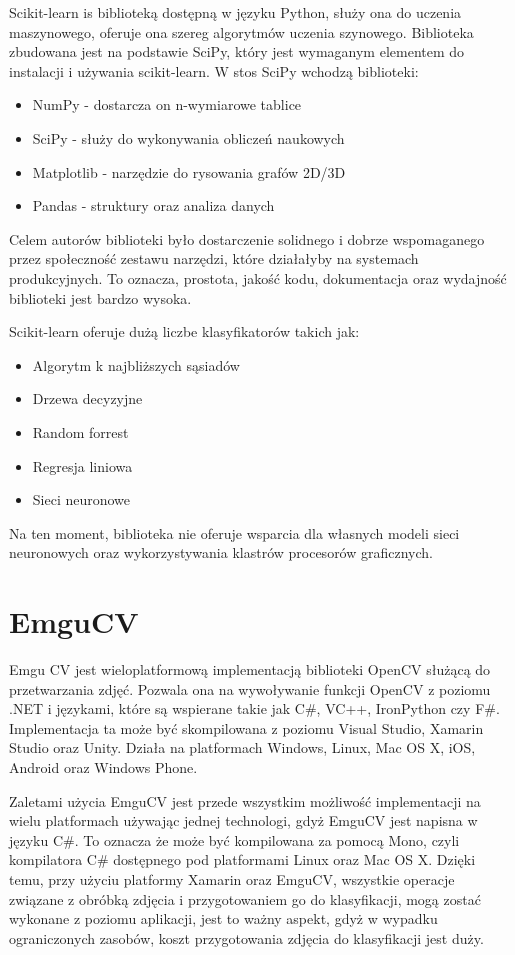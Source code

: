 \documentclass[brudnopis]{xmgr}
\begin{document}
Scikit-learn is biblioteką dostępną w języku Python, służy ona do uczenia maszynowego, oferuje ona szereg algorytmów uczenia szynowego. Biblioteka zbudowana jest na podstawie SciPy, który jest wymaganym elementem do instalacji i używania scikit-learn. W stos SciPy wchodzą biblioteki:

\begin{itemize}
\item
NumPy - dostarcza on n-wymiarowe tablice
\item
SciPy - służy do wykonywania obliczeń naukowych
\item
Matplotlib - narzędzie do rysowania grafów 2D/3D
\item
Pandas - struktury oraz analiza danych
\end{itemize}

Celem autorów biblioteki było dostarczenie solidnego i dobrze wspomaganego przez społeczność zestawu narzędzi, które działałyby na systemach produkcyjnych. To oznacza,  prostota, jakość kodu, dokumentacja oraz wydajność biblioteki jest bardzo wysoka.

Scikit-learn oferuje dużą liczbe klasyfikatorów takich jak:
\begin{itemize}
\item
Algorytm k najbliższych sąsiadów
\item
Drzewa decyzyjne
\item
Random forrest
\item
Regresja liniowa
\item
Sieci neuronowe
\end{itemize}

Na ten moment, biblioteka nie oferuje wsparcia dla własnych modeli sieci neuronowych oraz wykorzystywania klastrów procesorów graficznych.

\section{EmguCV}

Emgu CV jest wieloplatformową implementacją biblioteki OpenCV służącą do przetwarzania zdjęć. Pozwala ona na wywoływanie funkcji OpenCV z poziomu .NET i językami, które są wspierane takie jak C\#, VC++, IronPython czy F\#. Implementacja ta może być skompilowana z poziomu Visual Studio, Xamarin Studio oraz Unity. Działa na platformach Windows, Linux, Mac OS X, iOS, Android oraz Windows Phone.

Zaletami użycia EmguCV jest przede wszystkim możliwość implementacji na wielu platformach używając jednej technologi, gdyż EmguCV jest napisna w języku C\#. To oznacza że może być kompilowana za pomocą Mono, czyli kompilatora C\# dostępnego pod platformami Linux oraz Mac OS X. Dzięki temu, przy użyciu platformy Xamarin oraz EmguCV, wszystkie operacje związane z obróbką zdjęcia i przygotowaniem go do klasyfikacji, mogą zostać wykonane z poziomu aplikacji, jest to ważny aspekt, gdyż w wypadku ograniczonych zasobów, koszt przygotowania zdjęcia do klasyfikacji jest duży.
\end{document}
